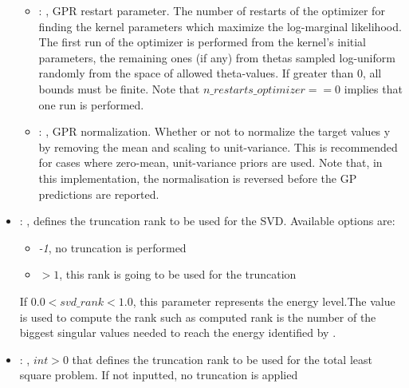 \begin{itemize}
\begin{itemize}
        \item {}: , 
          GPR restart parameter. The number of restarts of the optimizer for finding the
          kernel parameters which maximize the log-marginal likelihood. The first run of the
          optimizer                                                  is performed from the kernel’s
          initial parameters, the remaining ones (if any) from thetas
          sampled log-uniform randomly from the space of allowed theta-values. If greater than 0,
          all bounds must be finite. Note that $n\_restarts\_optimizer == 0$ implies that one run is
          performed.

        \item {}: , 
          GPR normalization. Whether or not to normalize the target values y by removing the mean
          and scaling                                                  to unit-variance. This is
          recommended for cases where zero-mean, unit-variance priors are used.
          Note that, in this implementation, the normalisation is reversed before the GP predictions
          are reported.
      \end{itemize}

    \item {}: , 
      defines the truncation rank to be used for the SVD.
      Available options are:                                                  \begin{itemize}
      \item \textit{-1}, no truncation is performed
      \item \textit{$>1$}, this rank is going to be used for the truncation
      \end{itemize}                                                  If $0.0 < svd\_rank < 1.0$,
      this parameter represents the energy level.The value is used to compute the rank such
      as computed rank is the number of the biggest singular values needed to reach the energy
      identified by                                                    .

    \item {}: , 
      $int > 0$ that defines the truncation rank to be used for the total
      least square problem. If not inputted, no truncation is applied


\end{itemize}
